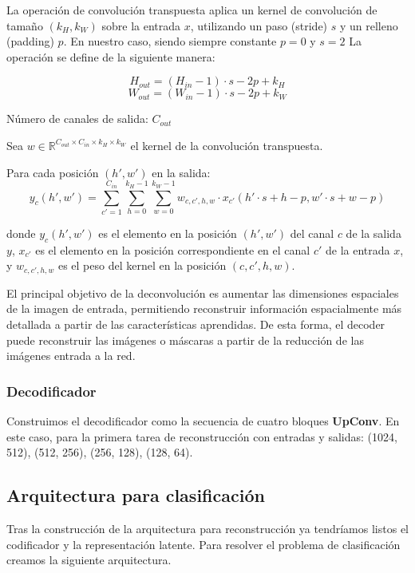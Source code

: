 La operación de convolución transpuesta aplica un kernel de convolución de tamaño \( (k_{H}, k_{W}) \) sobre la entrada \( x \), utilizando un paso (stride) \( s \) y un relleno (padding) \( p \). En nuestro caso, siendo siempre constante $p = 0$ y $s = 2$ La operación se define de la siguiente manera:

\[
H_{out} = (H_{in} - 1) \cdot s - 2p + k_{H}
\]
\[
W_{out} = (W_{in} - 1) \cdot s - 2p + k_{W}
\]

Número de canales de salida: \( C_{out} \)

Sea \( w \in \mathbb{R}^{C_{out} \times C_{in} \times k_{H} \times k_{W}} \) el kernel de la convolución transpuesta.

Para cada posición \( (h', w') \) en la salida:
\[
y_{c}(h', w') = \sum_{c'=1}^{C_{in}} \sum_{h=0}^{k_{H}-1} \sum_{w=0}^{k_{W}-1} w_{c,c',h,w} \cdot x_{c'}(h' \cdot s + h - p, w' \cdot s + w - p)
\]

donde \( y_{c}(h', w') \) es el elemento en la posición \( (h', w') \) del canal \( c \) de la salida \( y \), \( x_{c'} \) es el elemento en la posición correspondiente en el canal \( c' \) de la entrada \( x \), y \( w_{c,c',h,w} \) es el peso del kernel en la posición \( (c, c', h, w) \).

El principal objetivo de la deconvolución es aumentar las dimensiones espaciales de la imagen de entrada, permitiendo reconstruir información espacialmente más detallada a partir de las características aprendidas. De esta forma, el decoder puede reconstruir las imágenes o máscaras a partir de la reducción de las imágenes entrada a la red. 

\subsubsection{Decodificador}

Construimos el decodificador como la secuencia de cuatro bloques \textbf{UpConv}. En este caso, para la primera tarea de reconstrucción con entradas y salidas: (1024, 512), (512, 256), (256, 128), (128, 64). 

\subsection{Arquitectura para clasificación}

Tras la construcción de la arquitectura para reconstrucción ya tendríamos listos el codificador y la representación latente. Para resolver el problema de clasificación creamos la siguiente arquitectura.

